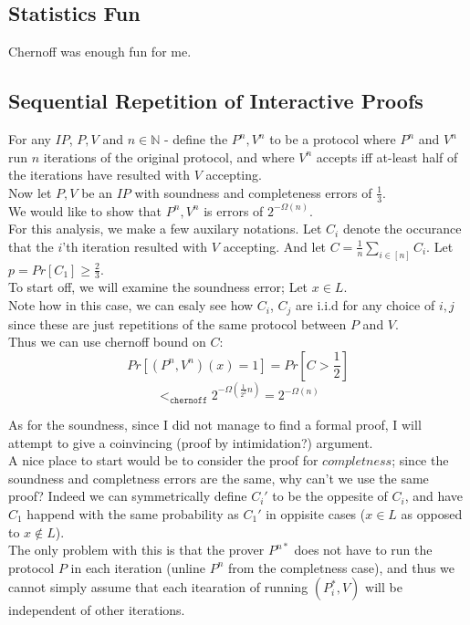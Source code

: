 \documentclass{article}
\begin{document}
\subsection{Statistics Fun}
Chernoff was enough fun for me.

\subsection{Sequential Repetition of Interactive Proofs}
For any $IP$, $P,V$ and $n\in\mathbb{N}$ - define the $P^n,V^n$
to be a protocol where $P^n$ and $V^n$ run $n$ iterations
of the original protocol, and where $V^n$ accepts iff at-least 
half of the iterations have resulted with $V$ accepting.\\

Now let $P,V$ be an $IP$ with soundness and completeness errors of $\frac{1}{3}$.\\
We would like to show that $P^n,V^n$ is errors of $2^{-\Omega(n)}$.\\

For this analysis, we make a few auxilary notations. Let $C_i$ denote
the occurance that the $i$'th iteration resulted with $V$ accepting. And let
$C=\frac{1}{n}\sum_{i\in[n]}C_i$. Let $p=Pr[C_1]\geq\frac{2}{3}$.\\

To start off, we will examine the soundness error; Let $x\in L$.\\
Note how in this case, we can esaly see how $C_i$, $C_j$ are i.i.d
for any choice of $i,j$ since these are just repetitions of the same protocol between $P$ and $V$.\\
Thus we can use chernoff bound on $C$:
\[
    Pr[(P^n,V^n)(x)=1]
    =Pr[C>\frac{1}{2}]
\]\[
    <_{\texttt{chernoff}}2^{-\Omega(\frac{1}{2^2}n)}=2^{-\Omega(n)}
\]

As for the soundness, since I did not manage to find a formal proof,
I will attempt to give a coinvincing (proof by intimidation?) argument.\\

A nice place to start would be to consider the proof for $completness$;
since the soundness and completness errors are the same,
why can't we use the same proof?
Indeed we can symmetrically define $C_i'$ to be the oppesite of $C_i$,
and have $C_1$ happend with the same probability as $C_1'$ in oppisite cases ($x\in L$ as opposed to $x\notin L$).\\
The only problem with this is that the prover $P^{n*}$ does not have
to run the protocol $P$ in each iteration (unline $P^n$ from the completness case),
and thus we cannot simply assume that each itearation of running $(P^*_i,V)$ will
be independent of other iterations.\\
\end{document}
